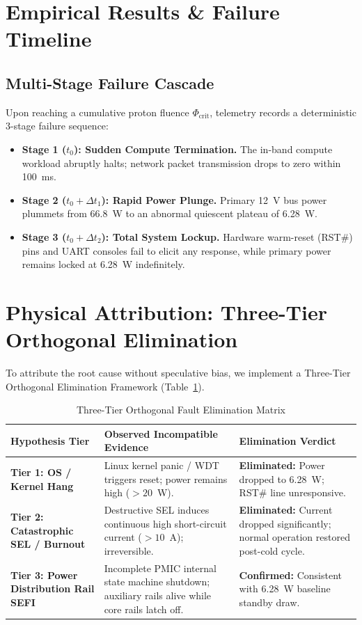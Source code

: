 \documentclass[conference]{IEEEtran}
\begin{document}
\section{Empirical Results \& Failure Timeline}
\subsection{Multi-Stage Failure Cascade}
Upon reaching a cumulative proton fluence $\Phi_{\text{crit}}$, telemetry records a deterministic 3-stage failure sequence:
\begin{itemize}
    \item \textbf{Stage 1 ($t_0$): Sudden Compute Termination.} The in-band compute workload abruptly halts; network packet transmission drops to zero within 100~ms.
    \item \textbf{Stage 2 ($t_0 + \Delta t_1$): Rapid Power Plunge.} Primary 12~V bus power plummets from 66.8~W to an abnormal quiescent plateau of 6.28~W.
    \item \textbf{Stage 3 ($t_0 + \Delta t_2$): Total System Lockup.} Hardware warm-reset (RST\#) pins and UART consoles fail to elicit any response, while primary power remains locked at 6.28~W indefinitely.
\end{itemize}

\section{Physical Attribution: Three-Tier Orthogonal Elimination}
To attribute the root cause without speculative bias, we implement a Three-Tier Orthogonal Elimination Framework (Table~\ref{tab:elimination}).

\begin{table}[htbp]
\caption{Three-Tier Orthogonal Fault Elimination Matrix}
\label{tab:elimination}
\begin{center}
\begin{tabular}{lp{3.2cm}p{3.2cm}}
\toprule
\textbf{Hypothesis Tier} & \textbf{Observed Incompatible Evidence} & \textbf{Elimination Verdict} \\
\midrule
\textbf{Tier 1: OS / Kernel Hang} & Linux kernel panic / WDT triggers reset; power remains high ($>20$~W). & \textbf{Eliminated:} Power dropped to 6.28~W; RST\# line unresponsive. \\
\midrule
\textbf{Tier 2: Catastrophic SEL / Burnout} & Destructive SEL induces continuous high short-circuit current ($>10$~A); irreversible. & \textbf{Eliminated:} Current dropped significantly; normal operation restored post-cold cycle. \\
\midrule
\textbf{Tier 3: Power Distribution Rail SEFI} & Incomplete PMIC internal state machine shutdown; auxiliary rails alive while core rails latch off. & \textbf{Confirmed:} Consistent with 6.28~W baseline standby draw. \\
\bottomrule
\end{tabular}
\end{center}
\end{table}
\end{document}
